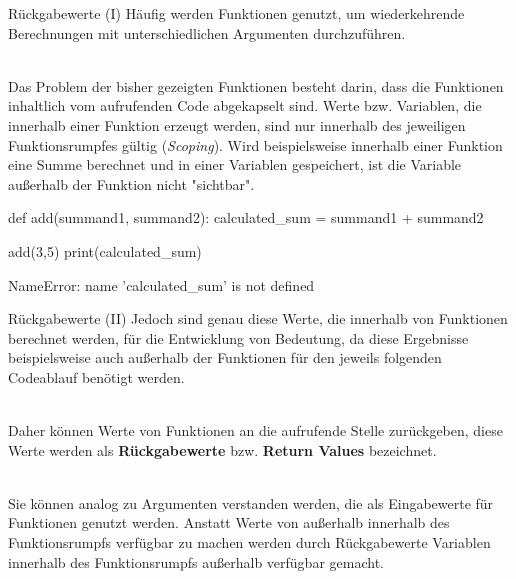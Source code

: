     
    \begin{frame}[fragile]{Rückgabewerte (I)}
        Häufig werden Funktionen genutzt, um wiederkehrende Berechnungen mit unterschiedlichen Argumenten durchzuführen. \\~\
        
        Das Problem der bisher gezeigten Funktionen besteht darin, dass die Funktionen inhaltlich vom aufrufenden Code abgekapselt sind. Werte bzw. Variablen, die innerhalb einer Funktion erzeugt werden, sind nur innerhalb des jeweiligen Funktionsrumpfes gültig (\textit{Scoping}). Wird beispielsweise innerhalb einer Funktion eine Summe berechnet und in einer Variablen gespeichert, ist die Variable außerhalb der Funktion nicht "sichtbar".

\begin{pythoncode}
def add(summand1, summand2):
    calculated_sum = summand1 + summand2

add(3,5)
print(calculated_sum)

NameError: name 'calculated_sum' is not defined
\end{pythoncode}
    \end{frame}
    
    \begin{frame}[fragile]{Rückgabewerte (II)}
        Jedoch sind genau diese Werte, die innerhalb von Funktionen berechnet werden, für die Entwicklung von Bedeutung, da diese Ergebnisse beispielsweise auch außerhalb der Funktionen für den jeweils folgenden Codeablauf benötigt werden. \\~\
        
        Daher können Werte von Funktionen an die aufrufende Stelle zurückgeben, diese Werte werden als \textbf{Rückgabewerte} bzw. \textbf{Return Values} bezeichnet.\\~\
        
        Sie können analog zu Argumenten verstanden werden, die als Eingabewerte für Funktionen genutzt werden. Anstatt Werte von außerhalb innerhalb des Funktionsrumpfs verfügbar zu machen werden durch Rückgabewerte Variablen innerhalb des Funktionsrumpfs außerhalb verfügbar gemacht.
    
    \end{frame}
    
